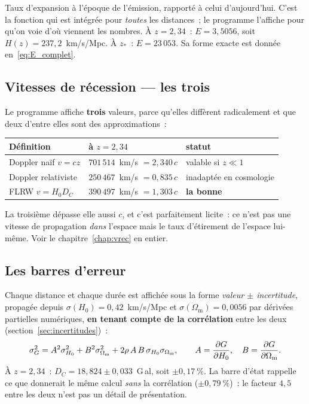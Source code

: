 \documentclass[11pt,a4paper,openany]{report}
\newcommand{\Hzero}{H_{0}}
\newcommand{\Om}{\Omega_{\mathrm{m}}}
\begin{document}
\begin{tcolorbox}[gui]
Taux d'expansion à l'époque de l'émission, rapporté à celui d'aujourd'hui.
C'est la fonction qui est intégrée pour \emph{toutes} les distances~; le
programme l'affiche pour qu'on voie d'où viennent les nombres. À $z=2{,}34$~:
$E = 3{,}5056$, soit $H(z) = 237{,}2$~km/s/Mpc. À $z_{*}$~: $E = 23\,053$.
Sa forme exacte est donnée en~\eqref{eq:E_complet}.
\end{tcolorbox}

\subsection{Vitesses de récession --- les trois}

\begin{tcolorbox}[gui]
Le programme affiche \textbf{trois} valeurs, parce qu'elles diffèrent
radicalement et que deux d'entre elles sont des approximations~:

\medskip
\begin{tabular}{lll}
\toprule
\textbf{Définition} & \textbf{à $z=2{,}34$} & \textbf{statut} \\
\midrule
Doppler naïf $v = cz$ & $701\,514$~km/s $=2{,}340\,c$ & valable si $z\ll1$ \\
Doppler relativiste & $250\,467$~km/s $=0{,}835\,c$ & inadaptée en cosmologie \\
FLRW $v = \Hzero D_{C}$ & $390\,497$~km/s $=1{,}303\,c$ & \textbf{la bonne} \\
\bottomrule
\end{tabular}

\medskip
La troisième dépasse elle aussi $c$, et c'est parfaitement licite~: ce n'est
pas une vitesse de propagation \emph{dans} l'espace mais le taux d'étirement de
l'espace lui-même. Voir le chapitre~\ref{chap:vrec} en entier.
\end{tcolorbox}

\subsection{Les barres d'erreur}

\begin{tcolorbox}[gui]
Chaque distance et chaque durée est affichée sous la forme
\emph{valeur $\pm$ incertitude}, propagée depuis
$\sigma(\Hzero) = 0{,}42$~km/s/Mpc et $\sigma(\Om) = 0{,}0056$ par dérivées
partielles numériques, \textbf{en tenant compte de la corrélation} entre les
deux (section~\ref{sec:incertitudes})~:
\[
\sigma_G^{2} = A^{2}\sigma_{\Hzero}^{2} + B^{2}\sigma_{\Om}^{2}
             + 2\rho\,A\,B\,\sigma_{\Hzero}\sigma_{\Om},
\qquad A = \pdv{G}{\Hzero},\quad B = \pdv{G}{\Om}.
\]
À $z = 2{,}34$~: $D_{C} = 18{,}824 \pm 0{,}033$~G\,al, soit $\pm0{,}17~\%$.
La barre d'état rappelle ce que donnerait le même calcul \emph{sans} la
corrélation ($\pm0{,}79~\%$)~: le facteur $4{,}5$ entre les deux n'est pas un
détail de présentation.
\end{tcolorbox}
\end{document}

